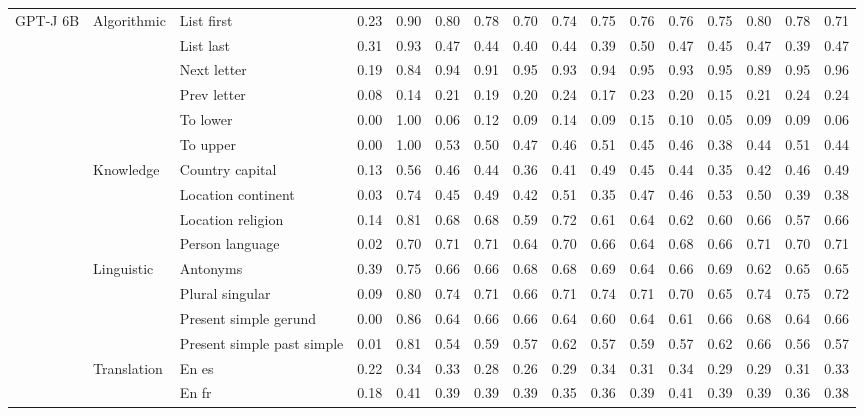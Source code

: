 \begin{center}
\begin{longtable}{lllrrrrrrrrrrrrr}
\multirow[t]{18}{*}{GPT-J 6B} & \multirow[t]{6}{*}{Algorithmic} & List first & 0.23 & 0.90 & 0.80 & 0.78 & 0.70 & 0.74 & 0.75 & 0.76 & 0.76 & 0.75 & 0.80 & 0.78 & 0.71 \\
 &  & List last & 0.31 & 0.93 & 0.47 & 0.44 & 0.40 & 0.44 & 0.39 & 0.50 & 0.47 & 0.45 & 0.47 & 0.39 & 0.47 \\
 &  & Next letter & 0.19 & 0.84 & 0.94 & 0.91 & 0.95 & 0.93 & 0.94 & 0.95 & 0.93 & 0.95 & 0.89 & 0.95 & 0.96 \\
 &  & Prev letter & 0.08 & 0.14 & 0.21 & 0.19 & 0.20 & 0.24 & 0.17 & 0.23 & 0.20 & 0.15 & 0.21 & 0.24 & 0.24 \\
 &  & To lower & 0.00 & 1.00 & 0.06 & 0.12 & 0.09 & 0.14 & 0.09 & 0.15 & 0.10 & 0.05 & 0.09 & 0.09 & 0.06 \\
 &  & To upper & 0.00 & 1.00 & 0.53 & 0.50 & 0.47 & 0.46 & 0.51 & 0.45 & 0.46 & 0.38 & 0.44 & 0.51 & 0.44 \\
\cline{2-16}
 & \multirow[t]{4}{*}{Knowledge} & Country capital & 0.13 & 0.56 & 0.46 & 0.44 & 0.36 & 0.41 & 0.49 & 0.45 & 0.44 & 0.35 & 0.42 & 0.46 & 0.49 \\
 &  & Location continent & 0.03 & 0.74 & 0.45 & 0.49 & 0.42 & 0.51 & 0.35 & 0.47 & 0.46 & 0.53 & 0.50 & 0.39 & 0.38 \\
 &  & Location religion & 0.14 & 0.81 & 0.68 & 0.68 & 0.59 & 0.72 & 0.61 & 0.64 & 0.62 & 0.60 & 0.66 & 0.57 & 0.66 \\
 &  & Person language & 0.02 & 0.70 & 0.71 & 0.71 & 0.64 & 0.70 & 0.66 & 0.64 & 0.68 & 0.66 & 0.71 & 0.70 & 0.71 \\
\cline{2-16}
 & \multirow[t]{4}{*}{Linguistic} & Antonyms & 0.39 & 0.75 & 0.66 & 0.66 & 0.68 & 0.68 & 0.69 & 0.64 & 0.66 & 0.69 & 0.62 & 0.65 & 0.65 \\
 &  & Plural singular & 0.09 & 0.80 & 0.74 & 0.71 & 0.66 & 0.71 & 0.74 & 0.71 & 0.70 & 0.65 & 0.74 & 0.75 & 0.72 \\
 &  & Present simple gerund & 0.00 & 0.86 & 0.64 & 0.66 & 0.66 & 0.64 & 0.60 & 0.64 & 0.61 & 0.66 & 0.68 & 0.64 & 0.66 \\
 &  & Present simple past simple & 0.01 & 0.81 & 0.54 & 0.59 & 0.57 & 0.62 & 0.57 & 0.59 & 0.57 & 0.62 & 0.66 & 0.56 & 0.57 \\
\cline{2-16}
 & \multirow[t]{4}{*}{Translation} & En es & 0.22 & 0.34 & 0.33 & 0.28 & 0.26 & 0.29 & 0.34 & 0.31 & 0.34 & 0.29 & 0.29 & 0.31 & 0.33 \\
 &  & En fr & 0.18 & 0.41 & 0.39 & 0.39 & 0.39 & 0.35 & 0.36 & 0.39 & 0.41 & 0.39 & 0.39 & 0.36 & 0.38 \\

\end{longtable}
\end{center}
